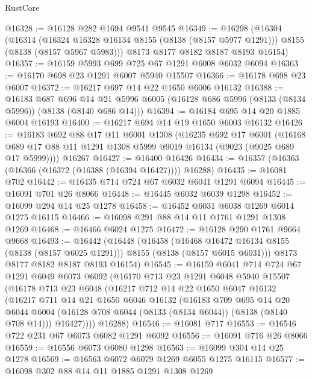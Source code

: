 \begin{lexlean}{RustCore}
\begin{coremodule}
@16328 := @16128 @282 @1694 @9541 @9545
@16349 := @16298
    (@16304
      (@16314
        (@16324 @16328 @16134 @8155 (@8138 (@8157 @5977 @1291)))
        @8155
        (@8138 (@8157 @5967 @5983)))
      @8173
      @8177
      @8182
      @8187
      @8193
      @16154)
@16357 := @16159 @5993 @699 @725 @67 @1291 @6008 @6032 @6094
@16363 := @16170 @698 @23 @1291 @6007 @5940 @15507
@16366 := @16178 @698 @23 @6007
@16372 := @16217 @697 @14 @22 @1650 @6006 @16132
@16388 := @16183
    @687
    @696
    @14
    @21
    @5996
    @6005
    (@16128 @686 @5996 (@8133 (@8134 @5996)) (@8138 (@8140 @686 @14)))
@16394 := @16184 @695 @14 @20 @1885 @6004 @16193
@16400 := @16217 @694 @14 @19 @1650 @6003 @16132
@16426 := @16183
    @692
    @88
    @17
    @11
    @6001
    @1308
    (@16235
      @692
      @17
      @6001
      (@16168 @689 @17 @88 @11 @1291 @1308 @5999 @9019 @16134 (@9023 (@9025 @689 @17 @5999))))
    @16267
@16427 := @16400 @16426
@16434 := @16357 (@16363 (@16366 (@16372 (@16388 (@16394 @16427)))) @16288)
@16435 := @16081 @702
@16442 := @16435 @714 @724 @67 @6032 @6041 @1291 @6094
@16445 := @16091 @701 @26 @8066
@16448 := @16445 @6032 @6039 @1298
@16452 := @16099 @294 @14 @25 @1278
@16458 := @16452 @6031 @6038 @1269 @6014 @1275 @16115
@16466 := @16098 @291 @88 @14 @11 @1761 @1291 @1308 @1269
@16468 := @16466 @6024 @1275
@16472 := @16128 @290 @1761 @9664 @9668
@16493 := @16442
    (@16448
      (@16458
        (@16468 @16472 @16134 @8155 (@8138 (@8157 @6025 @1291)))
        @8155
        (@8138 (@8157 @6015 @6031)))
      @8173
      @8177
      @8182
      @8187
      @8193
      @16154)
@16545 := @16159
    @6041
    @714
    @724
    @67
    @1291
    @6049
    @6073
    @6092
    (@16170
      @713
      @23
      @1291
      @6048
      @5940
      @15507
      (@16178
        @713
        @23
        @6048
        (@16217
          @712
          @14
          @22
          @1650
          @6047
          @16132
          (@16217
            @711
            @14
            @21
            @1650
            @6046
            @16132
            (@16183
              @709
              @695
              @14
              @20
              @6044
              @6004
              (@16128 @708 @6044 (@8133 (@8134 @6044)) (@8138 (@8140 @708 @14)))
              @16427))))
      @16288)
@16546 := @16081 @717
@16553 := @16546 @722 @231 @67 @6073 @6082 @1291 @6092
@16556 := @16091 @716 @26 @8066
@16559 := @16556 @6073 @6080 @1298
@16563 := @16099 @304 @14 @25 @1278
@16569 := @16563 @6072 @6079 @1269 @6055 @1275 @16115
@16577 := @16098 @302 @88 @14 @11 @1885 @1291 @1308 @1269

\end{coremodule}
\end{lexlean}
